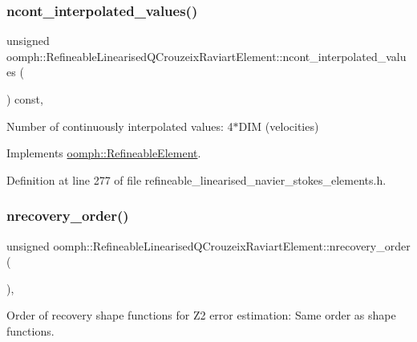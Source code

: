 \subsubsection{\texorpdfstring{ncont\+\_\+interpolated\+\_\+values()}{ncont\_interpolated\_values()}}
{\footnotesize\ttfamily unsigned oomph\+::\+Refineable\+Linearised\+Q\+Crouzeix\+Raviart\+Element\+::ncont\+\_\+interpolated\+\_\+values (\begin{DoxyParamCaption}{ }\end{DoxyParamCaption}) const\hspace{0.3cm}{\ttfamily [inline]}, {\ttfamily [virtual]}}



Number of continuously interpolated values\+: 4$\ast$\+D\+IM (velocities) 



Implements \hyperlink{classoomph_1_1RefineableElement_a53e171a18c9f43f1db90a6876516a073}{oomph\+::\+Refineable\+Element}.



Definition at line 277 of file refineable\+\_\+linearised\+\_\+navier\+\_\+stokes\+\_\+elements.\+h.

\mbox{\label{classoomph_1_1RefineableLinearisedQCrouzeixRaviartElement_a1c1a77528956ab8a2ac0268511195efd}} 
\subsubsection{\texorpdfstring{nrecovery\+\_\+order()}{nrecovery\_order()}}
{\footnotesize\ttfamily unsigned oomph\+::\+Refineable\+Linearised\+Q\+Crouzeix\+Raviart\+Element\+::nrecovery\+\_\+order (\begin{DoxyParamCaption}{ }\end{DoxyParamCaption})\hspace{0.3cm}{\ttfamily [inline]}, {\ttfamily [virtual]}}



Order of recovery shape functions for Z2 error estimation\+: Same order as shape functions. 



